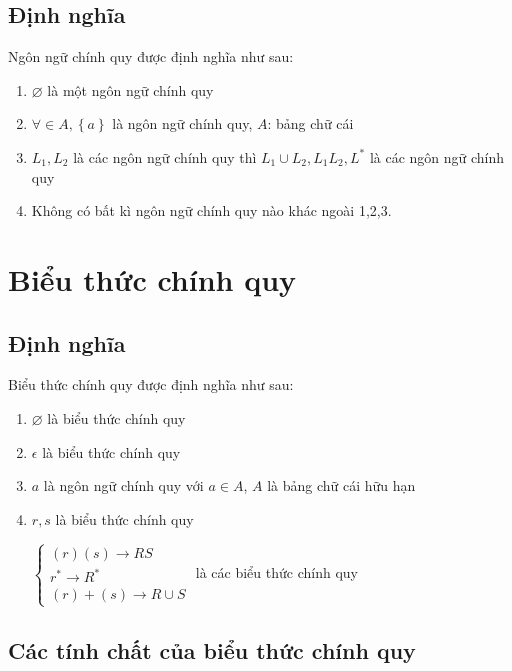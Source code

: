 \documentclass[14pt]{extreport}
\begin{document}
\subsection{Định nghĩa}

Ngôn ngữ chính quy được định nghĩa như sau:

\begin{enumerate}
\item $\varnothing$ là một ngôn ngữ chính quy
\item $\forall \in A,\left\{a\right\}$ là ngôn ngữ chính quy, $A$: bảng chữ cái
\item $L_1,L_2$ là các ngôn ngữ chính quy thì $L_1 \cup L_2,L_1L_2,L^*$ là các ngôn ngữ chính quy
\item Không có bất kì ngôn ngữ chính quy nào khác ngoài 1,2,3.
\end{enumerate}

\section{Biểu thức chính quy}
\subsection{Định nghĩa}

Biểu thức chính quy được định nghĩa như sau:

\begin{enumerate}
\item $\varnothing$ là biểu thức chính quy
\item $\epsilon$ là biểu thức chính quy
\item $a$ là ngôn ngữ chính quy với $a \in A$, $A$ là bảng chữ cái hữu hạn
\item $r,s$ là biểu thức chính quy

$\left\{\begin{matrix}
(r)(s)\rightarrow RS\\ 
r^{*}\rightarrow R^{*}
\\ (r)+(s)\rightarrow R\cup S

\end{matrix}\right.$ là các biểu thức chính quy
\end{enumerate}
\subsection{Các tính chất của biểu thức chính quy}
\end{document}

